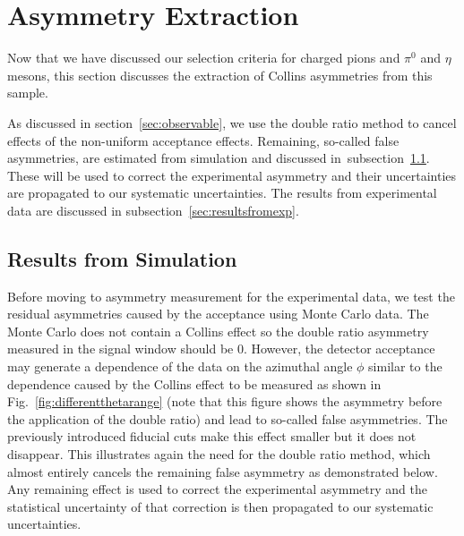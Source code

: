 \section{Asymmetry Extraction}
 Now that we have discussed our selection criteria for charged pions and $\pi^0$ and $\eta$ mesons, this section discusses the extraction of Collins asymmetries from this sample.%

As discussed in section~\ref{sec:observable}, we use the double ratio method to cancel effects of the non-uniform acceptance effects.
Remaining, so-called false asymmetries, are estimated from simulation and discussed in~subsection~\ref{sec:resutlsfrommc}. These will be used to correct the experimental asymmetry and their uncertainties are propagated to our systematic uncertainties.
The results from experimental data are discussed in subsection~\ref{sec:resultsfromexp}.

\subsection{Results from Simulation}
\label{sec:resutlsfrommc}
Before moving to asymmetry measurement for the experimental data, we test the residual asymmetries caused by the acceptance using  Monte Carlo data. The Monte Carlo does not contain a Collins effect  so the double ratio asymmetry measured in the signal window should be 0. However, the detector acceptance may generate a dependence of the data on the azimuthal angle $\phi$ similar to the dependence caused by the Collins effect to be measured as shown in Fig.~\ref{fig:differentthetarange} (note that this figure shows the asymmetry before the application of the double ratio) and lead to  so-called false asymmetries. The previously introduced fiducial cuts make this effect smaller but it does not disappear.
This illustrates again the need for the double ratio method, which almost entirely cancels the remaining false asymmetry as demonstrated below. Any remaining effect 
is used to correct the experimental asymmetry and the statistical uncertainty of that correction is then propagated to our systematic uncertainties.

